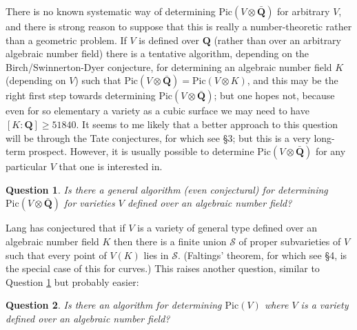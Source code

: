 \documentclass[12pt]{article}
\def\bQ{{\mathbf Q}}
\def\sS{{\mathcal S}}
\def\bpr{\begin{question} \label}
\def\epr{\end{question}}
\newtheorem{question}{Question}
\begin{document}
There is no known systematic way of determining Pic$(V\otimes\bar{\bQ})$ for
arbitrary $V$, and there is strong reason to suppose that this is really a
number-theoretic rather than a geometric problem. If $V$ is defined over $\bQ$
(rather than over an arbitrary algebraic number field) there is a tentative
algorithm, depending on the Birch/Swinnerton-Dyer conjecture,
for determining an algebraic number field $K$ (depending on $V$)
such that Pic$(V\otimes\bar{\bQ})=$Pic$(V\otimes K)$, and this may be the
right first step towards determining Pic$(V\otimes\bar{\bQ})$; but one hopes
not, because even for so elementary a variety
as a cubic surface we may need to have $[K:\bQ]\geq51840$. It seems to me
likely that a better approach to this question will be through the Tate
conjectures, for which see \S3; but this is a very long-term prospect.
However, it is usually possible to determine Pic$(V\otimes\bar{\bQ})$ for any
particular $V$ that one is interested in.
\bpr{Q3} Is there a general algorithm (even conjectural)
for determining ${\mathrm{Pic}}
(V\otimes\bar{\bQ})$ for varieties $V$ defined over an algebraic
number field?
\epr

Lang has conjectured that if $V$ is a variety of general type defined over an
algebraic number field $K$ then there is a finite union $\sS$ of proper
subvarieties of $V$ such that every point of $V(K)$ lies in
$\sS$. (Faltings' theorem, for which see \S4, is the special case of this for
curves.) This raises another question, similar to Question \ref{Q3} but
probably easier:
\bpr{Q8} Is there an algorithm for determining ${\mathrm{Pic}}(V)$ where $V$
is a variety defined over an algebraic number field?
\epr
\end{document}
